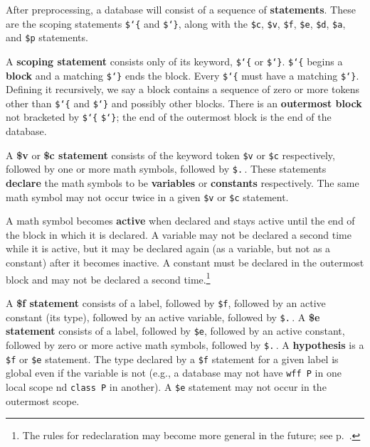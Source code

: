 After preprocessing, a database will consist of a sequence of {\bf
statements}.
These are the scoping statements \texttt{\$\char`\{} and
\texttt{\$\char`\}}, along with the \texttt{\$c}, \texttt{\$v},
\texttt{\$f}, \texttt{\$e}, \texttt{\$d}, \texttt{\$a}, and \texttt{\$p}
statements.

A {\bf scoping statement} consists only of its
keyword, \texttt{\$\char`\{} or \texttt{\$\char`\}}. \texttt{\$\char`\{} begins a {\bf
block} and a matching \texttt{\$\char`\}} ends the block. Every \texttt{\$\char`\{}
must have a matching \texttt{\$\char`\}}. Defining it recursively, we say a block
contains a sequence of zero or more tokens other
than \texttt{\$\char`\{} and \texttt{\$\char`\}} and
possibly other blocks.  There is an {\bf outermost
block} not bracketed by \texttt{\$\char`\{} \texttt{\$\char`\}}; the end
of the outermost block is the end of the database.


A {\bf \$v} or {\bf \$c statement} consists of the keyword token \texttt{\$v} or \texttt{\$c} respectively,
followed by one or more math symbols, followed by \texttt{\$.}\,.  These
statements {\bf declare} the math symbols to be {\bf
variables} or {\bf constants}
respectively. The same math symbol may not occur twice in a given \texttt{\$v} or
\texttt{\$c} statement.


A math symbol becomes {\bf active} when declared
and stays active until the end of the block in which it is declared.  A
variable may not be declared a second time while it is active, but it
may be declared again (as a variable, but not as a constant) after it
becomes inactive.  A constant must be declared in the outermost block and may
not be declared a second time.\footnote{The rules for redeclaration may
become more general in the future;
see p.~\pageref{redeclarationf}.}

A {\bf \$f statement} consists of a label,
followed by \texttt{\$f}, followed by an active constant (its type), followed by an
active variable, followed by \texttt{\$.}\,.  A {\bf \$e
statement} consists of a label, followed
by \texttt{\$e}, followed by an active constant, followed by zero or more
active math symbols, followed by \texttt{\$.}\,.  A {\bf
hypothesis} is a \texttt{\$f} or \texttt{\$e}
statement.
The type declared by a \texttt{\$f} statement for a given label
is global even if the variable is not
(e.g., a database may not have \texttt{wff P} in one local scope
nd \texttt{class P} in another).
A \texttt{\$e} statement may not occur in the outermost scope.

